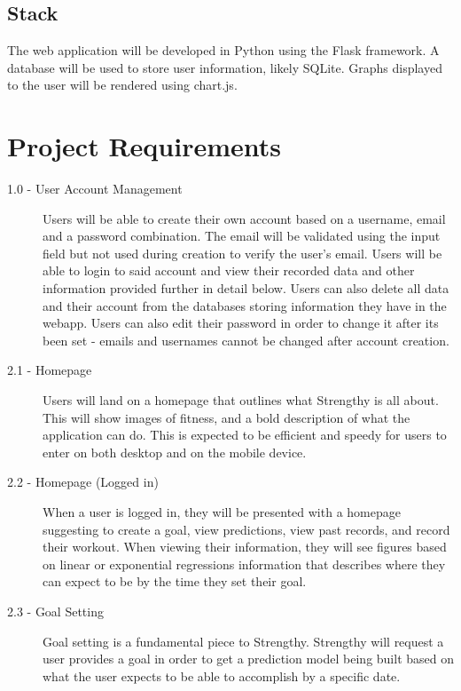 \documentclass[12pt]{article}
\begin{document}
\subsection{Stack}
The web application will be developed in Python using the Flask framework. A database will be used to store user information, likely SQLite. Graphs displayed to the user will be rendered using chart.js.


\section{Project Requirements}
\begin{description}
    \item[1.0 - User Account Management]
        Users will be able to create their own account based on a username, email and a password combination. The email will be validated using the input field but not used during creation to verify the user's email. Users will be able to login to said account and view their recorded data and other information provided further in detail below. Users can also delete all data and their account from the databases storing information they have in the webapp. Users can also edit their password in order to change it after its been set - emails and usernames cannot be changed after account creation.    \item[2.1 - Homepage]
        Users will land on a homepage that outlines what Strengthy is all about. This will show images of fitness, and a bold description of what the application can do. This is expected to be efficient and speedy for users to enter on both desktop and on the mobile device.      \item[2.2 - Homepage (Logged in)]
        When a user is logged in, they will be presented with a homepage suggesting to create a goal, view predictions, view past records, and record their workout. When viewing their information, they will see figures based on linear or exponential regressions information that describes where they can expect to be by the time they set their goal.    \item[2.3 - Goal Setting]         Goal setting is a fundamental piece to Strengthy. Strengthy will request a user provides a goal in order to get a prediction model being built based on what the user expects to be able to accomplish by a specific date.\end{description} 

\begingroup
\renewcommand{\section}[2]{}
\begin{thebibliography}{10}

\bigskip


\end{thebibliography}
\endgroup
\end{document}

